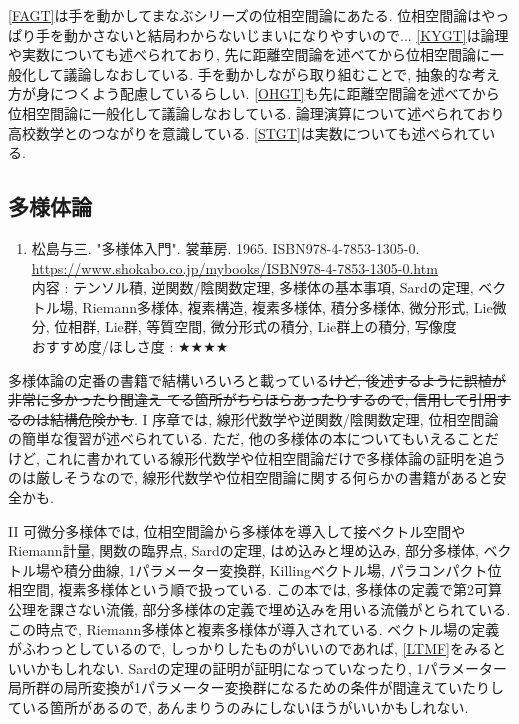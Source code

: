 \documentclass[10pt,a4paper]{jsarticle}
\begin{document}
    \ref{FAGT}は手を動かしてまなぶシリーズの位相空間論にあたる. 位相空間論はやっぱり手を動かさないと結局わからないじまいになりやすいので... \ref{KYGT}は論理や実数についても述べられており, 先に距離空間論を述べてから位相空間論に一般化して議論しなおしている. 手を動かしながら取り組むことで, 抽象的な考え方が身につくよう配慮しているらしい. \ref{OHGT}も先に距離空間論を述べてから位相空間論に一般化して議論しなおしている. 論理演算について述べられており高校数学とのつながりを意識している. \ref{STGT}は実数についても述べられている. 
\subsection{多様体論}
    \begin{enumerate}
        \renewcommand{\theenumi}{[MF\arabic{enumi}]}
        \renewcommand{\labelenumi}{\theenumi}
        \setcounter{enumi}{0}
        \item \label{SYMF} 松島与三. "多様体入門". 裳華房. 1965. ISBN978-4-7853-1305-0. \\
        \url{https://www.shokabo.co.jp/mybooks/ISBN978-4-7853-1305-0.htm} \\
        内容 : テンソル積, 逆関数/陰関数定理, 多様体の基本事項, Sardの定理, ベクトル場, Riemann多様体, 複素構造, 複素多様体, 積分多様体, 微分形式, Lie微分, 位相群, Lie群, 等質空間, 微分形式の積分, Lie群上の積分, 写像度\\
        おすすめ度/ほしさ度 : $\bigstar \bigstar \bigstar \bigstar $
    \end{enumerate}\par
    多様体論の定番の書籍で結構いろいろと載っている\sout{けど, 後述するように誤植が非常に多かったり間違え てる箇所がちらほらあったりするので, 信用して引用するのは結構危険かも}. I 序章では, 線形代数学や逆関数/陰関数定理, 位相空間論の簡単な復習が述べられている. ただ, 他の多様体の本についてもいえることだけど, これに書かれている線形代数学や位相空間論だけで多様体論の証明を追うのは厳しそうなので, 線形代数学や位相空間論に関する何らかの書籍があると安全かも. \par
    II 可微分多様体では, 位相空間論から多様体を導入して接ベクトル空間やRiemann計量, 関数の臨界点, Sardの定理, はめ込みと埋め込み, 部分多様体, ベクトル場や積分曲線, 1パラメーター変換群, Killingベクトル場, パラコンパクト位相空間, 複素多様体という順で扱っている. この本では, 多様体の定義で第2可算公理を課さない流儀, 部分多様体の定義で埋め込みを用いる流儀がとられている. この時点で, Riemann多様体と複素多様体が導入されている. ベクトル場の定義がふわっとしているので, しっかりしたものがいいのであれば, \ref{LTMF}をみるといいかもしれない. Sardの定理の証明が証明になっていなったり, 1パラメーター局所群の局所変換が1パラメーター変換群になるための条件が間違えていたりしている箇所があるので, あんまりうのみにしないほうがいいかもしれない. \par
\end{document}
